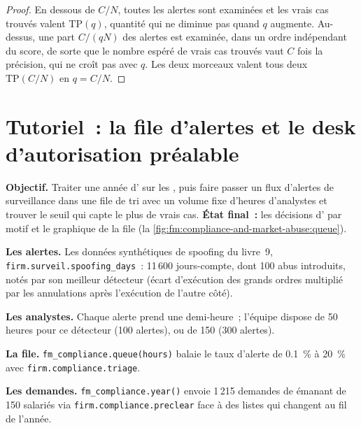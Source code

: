 \begin{proof}
En dessous de $C/N$, toutes les alertes sont examinées et les vrais cas trouvés valent $\mathrm{TP}(q)$, quantité qui ne diminue pas quand $q$ augmente. Au-dessus, une part $C/(qN)$ des
alertes est examinée, dans un ordre indépendant du score, de sorte que le nombre espéré de vrais cas trouvés vaut $C$ fois la précision, qui ne croît pas avec
$q$. Les deux morceaux valent tous deux $\mathrm{TP}(C/N)$ en $q=C/N$.
\end{proof}

\label{lst:fm:compliance-and-market-abuse:triage}

\section{Tutoriel~: la file d'alertes et le desk d'autorisation préalable}\label{tut:fm:compliance-and-market-abuse:tut}

\begin{tutorial}
\textbf{Objectif.} Traiter une année d' sur les , puis faire passer un flux d'alertes de surveillance dans une file de tri avec un volume fixe d'heures d'analystes
et trouver le seuil qui capte le plus de vrais cas. \textbf{État final~:} les décisions d' par motif et le graphique de la file
(la \cref{fig:fm:compliance-and-market-abuse:queue}).
\begin{tutsteps}
\item \textbf{Les alertes.} Les données synthétiques de spoofing du livre~9, \texttt{firm.surveil.spoofing\_days}~: 11\,600 jours-compte, dont 100 abus introduits,
notés par son meilleur détecteur (écart d'exécution des grands ordres multiplié par les annulations après l'exécution de l'autre côté).
\item \textbf{Les analystes.} Chaque alerte prend une demi-heure~; l'équipe dispose de 50 heures pour ce détecteur (100 alertes), ou de 150 (300 alertes).
\item \textbf{La file.} \texttt{fm\_compliance.queue(hours)} balaie le taux d'alerte de 0.1~\% à 20~\% avec \texttt{firm.compliance.triage}.
\item \textbf{Les demandes.} \texttt{fm\_compliance.year()} envoie 1\,215 demandes de  émanant de 150 salariés via
\texttt{firm.compliance.preclear} face à des listes qui changent au fil de l'année.
\end{tutsteps}
\end{tutorial}

